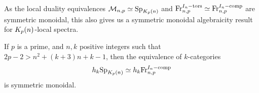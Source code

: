 
As the local duality equivalences $\mathcal{M}_{n,p} \simeq \mathrm{Sp}_{K_p(n)}$ and $\mathrm{Fr}_{n,p}^{I_n-\mathrm{tors}} \simeq \mathrm{Fr}_{n,p}^{I_n-\mathrm{comp}}$ are symmetric monoidal, this also gives us a symmetric monoidal algebraicity result for ${K_p(n)}$-local spectra. 

\begin{corollary}
    If $p$ is a prime, and $n, k$ positive integers such that $2p-2>n^2+(k+3)n+k-1$, then the equivalence of $k$-categories
    \[h_k \mathrm{Sp}_{K_p(n)}\simeq h_k \mathrm{Fr}_{n,p}^{I_n-\mathrm{comp}}\]
    is symmetric monoidal. 
\end{corollary}
